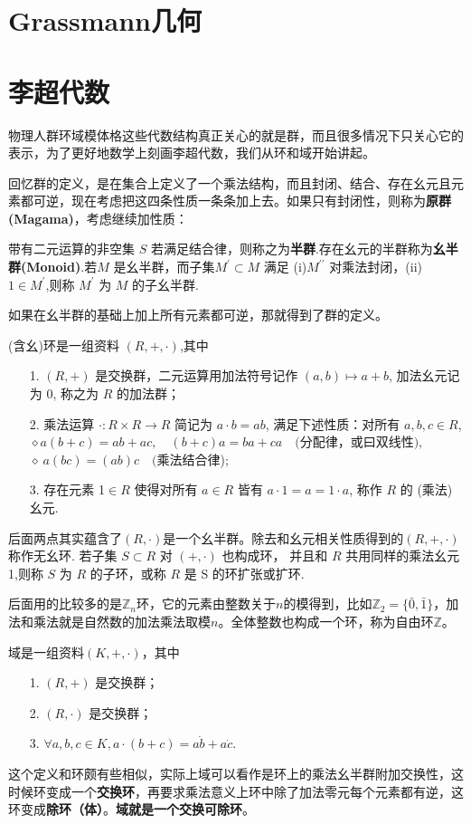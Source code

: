 \section{Grassmann几何}

\section{李超代数}
物理人群环域模体格这些代数结构真正关心的就是群，而且很多情况下只关心它的表示，为了更好地数学上刻画李超代数，我们从环和域开始讲起。

回忆群的定义，是在集合上定义了一个乘法结构，而且封闭、结合、存在幺元且元素都可逆，现在考虑把这四条性质一条条加上去。如果只有封闭性，则称为\textbf{原群(Magama)}，考虑继续加性质：
\begin{definition}[半群与幺半群]
	带有二元运算的非空集 $S$ 若满足结合律，则称之为\textbf{半群}.存在幺元的半群称为\textbf{幺半群(Monoid)}.若$M$ 是幺半群，而子集$M^{\prime}\subset M$ 满足 (i)$M^{\prime\prime}$ 对乘法封闭，(ii) $1\in M^{\prime}$,则称 $M^{\prime}$ 为 $M$ 的子幺半群.
\end{definition}
如果在幺半群的基础上加上所有元素都可逆，那就得到了群的定义。
\begin{definition}
	(含幺)环是一组资料 $(R,+,\cdot)$,其中
	\begin{itemize}
		\item [1.]$(R,+)$ 是交换群，二元运算用加法符号记作 $(a,b)\mapsto a+b$, 加法幺元记为 0, 称之为 $R$ 的加法群；
		\item [2.]乘法运算 $\cdot:R\times R\to R$ 简记为 $a\cdot b=ab$, 满足下述性质：对所有 $a,b,c\in R$, $\diamond a( b+ c) = ab+ ac, \quad ( b+ c) a= ba+ ca\quad ( $分配律，或曰双线性$) , $
		$\diamond\:a(bc)=(ab)c\quad($乘法结合律);
		\item[3.]存在元素 1$\in R$ 使得对所有 $a\in R$ 皆有 $a\cdot1=a=1\cdot a$, 称作 $R$ 的 (乘法) 幺元.
	\end{itemize}
		后面两点其实蕴含了$(R,\cdot)$是一个幺半群。除去和幺元相关性质得到的$(R,+,\cdot)$ 称作无幺环. 若子集 $S\subset R$ 对 $(+,\cdot)$ 也构成环， 并且和 $R$ 共用同样的乘法幺元 1,则称 $S$ 为 $R$ 的子环，或称 $R$ 是 S 的环扩张或扩环.
\end{definition}
\begin{example}
	后面用的比较多的是$\mathbb{Z}_n$环，它的元素由整数关于$n$的模得到，比如$\mathbb{Z}_2=\{\bar 0,\bar 1\}$，加法和乘法就是自然数的加法乘法取模$n$。全体整数也构成一个环，称为自由环$\mathbb{Z}$。
\end{example}
\begin{definition}
	域是一组资料$(K,+,\cdot)$，其中
	\begin{itemize}
		\item [1.]$(R,+)$ 是交换群；
		\item [2.]$(R,\cdot)$ 是交换群；
		\item [3.]$\forall a,b,c\in K,a\cdot (b+c)=a\dot b+a\dot c$.
	\end{itemize}
	这个定义和环颇有些相似，实际上域可以看作是环上的乘法幺半群附加交换性，这时候环变成一个\textbf{交换环}，再要求乘法意义上环中除了加法零元每个元素都有逆，这环变成\textbf{除环（体）}。\textbf{域就是一个交换可除环}。
\end{definition}
